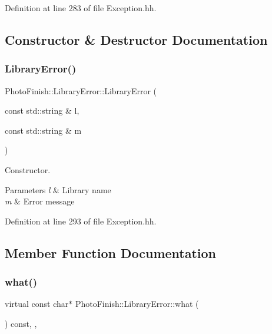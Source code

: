 Definition at line 283 of file Exception.\+hh.



\subsection{Constructor \& Destructor Documentation}
\mbox{\label{class_photo_finish_1_1_library_error_a09132fe2fd229890f2e1d509161032bf}} 
\subsubsection{\texorpdfstring{Library\+Error()}{LibraryError()}}
{\footnotesize\ttfamily Photo\+Finish\+::\+Library\+Error\+::\+Library\+Error (\begin{DoxyParamCaption}\item[{const std\+::string \&}]{l,  }\item[{const std\+::string \&}]{m }\end{DoxyParamCaption})\hspace{0.3cm}{\ttfamily [inline]}}



Constructor. 


\begin{DoxyParams}{Parameters}
{\em l} & Library name \\
\hline
{\em m} & Error message \\
\hline
\end{DoxyParams}


Definition at line 293 of file Exception.\+hh.



\subsection{Member Function Documentation}
\mbox{\label{class_photo_finish_1_1_library_error_a197031356327dc3b10f49536987abb73}} 
\subsubsection{\texorpdfstring{what()}{what()}}
{\footnotesize\ttfamily virtual const char$\ast$ Photo\+Finish\+::\+Library\+Error\+::what (\begin{DoxyParamCaption}{ }\end{DoxyParamCaption}) const\hspace{0.3cm}{\ttfamily [inline]}, {\ttfamily [virtual]}, {\ttfamily [noexcept]}}



